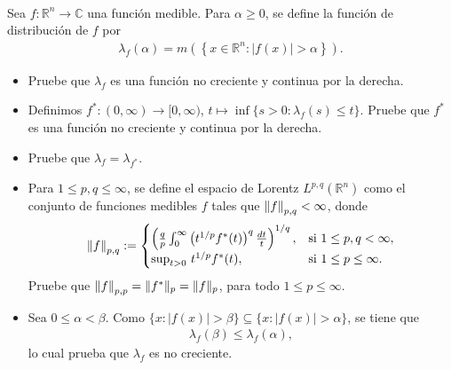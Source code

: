 \begin{homeworkProblem}
  \\
  Sea $f : \mathbb{R}^n \to \mathbb{C}$ una función medible. Para $\alpha \geq 0$, se define la función de distribución de $f$ por
  \begin{align*}
    \lambda_f(\alpha) = m\left( \left\{ x \in \mathbb{R}^n : |f(x)| > \alpha \right\} \right).   
  \end{align*}
  \begin{itemize}
    \item[(i)] Pruebe que $\lambda_f$ es una función no creciente y continua por la derecha. 
    \item[(ii)] Definimos $f^* : (0,\infty) \to [0,\infty) $,  $t \mapsto \inf\{ s > 0 : \lambda_f(s) \leq t \}$. Pruebe que $f^*$ es una función no creciente y continua por la derecha.
    \item[(iii)] Pruebe que $\lambda_f = \lambda_{f^*}$.
    \item[(iv)] Para $1 \leq p, q \leq \infty$, se define el espacio de Lorentz $L^{p,q}(\mathbb{R}^n)$ como el conjunto de funciones medibles $f$ tales que $\left\|f\right\|_{p,q} < \infty $, donde
    \begin{align*}
      \left\|f\right\|_{p,q} := 
      \begin{cases}
        \left( \frac{q}{p} \int_0^\infty \left( t^{1/p} f^*(t) \right)^q \frac{dt}{t} \right)^{1/q}, & \text{si } 1 \leq p, q < \infty, \\
        \sup_{t > 0} \, t^{1/p} f^*(t), & \text{si } 1 \leq p \leq \infty.
      \end{cases}
    \end{align*}
    Pruebe que $\left\|f\right\|_{p,p} = \|f^*\|_p = \|f\|_p$, para todo $1 \leq p \leq \infty$.
  \end{itemize}
  \begin{solution}
    \begin{itemize}
      \item[(i)] Sea $0 \leq \alpha < \beta$. Como $\{x : |f(x)| > \beta\} \subseteq \{x : |f(x)| > \alpha\}$, se tiene que
        \begin{align*}
          \lambda_f(\beta) \leq \lambda_f(\alpha),
        \end{align*}
        lo cual prueba que $\lambda_f$ es no creciente.
      

\end{itemize}
\end{solution}
\end{homeworkProblem}
